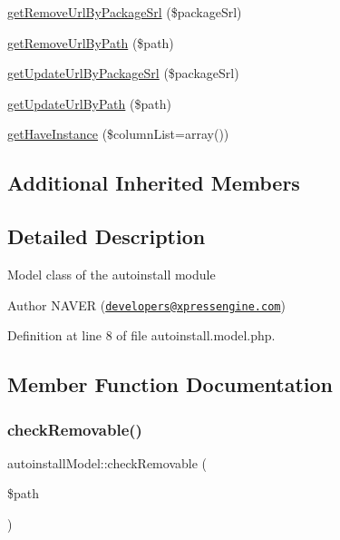 \begin{DoxyCompactItemize}
\hyperlink{classautoinstallModel_aa2b3fa8f08e15bfb1a9a061aca6dfa8c}{get\+Remove\+Url\+By\+Package\+Srl} (\$package\+Srl)
\item 
\hyperlink{classautoinstallModel_a40c61ad733cb70958d2c550f06abc15d}{get\+Remove\+Url\+By\+Path} (\$path)
\item 
\hyperlink{classautoinstallModel_a20c447d210dff0edc286007b92ec881f}{get\+Update\+Url\+By\+Package\+Srl} (\$package\+Srl)
\item 
\hyperlink{classautoinstallModel_a560f4c8850324ee4e0c3dc74573bc7d9}{get\+Update\+Url\+By\+Path} (\$path)
\item 
\hyperlink{classautoinstallModel_ac2f036319c53b9a9392a7b4534fef4fd}{get\+Have\+Instance} (\$column\+List=array())
\end{DoxyCompactItemize}
\subsection*{Additional Inherited Members}


\subsection{Detailed Description}
Model class of the autoinstall module \begin{DoxyAuthor}{Author}
N\+A\+V\+ER (\href{mailto:developers@xpressengine.com}{\tt developers@xpressengine.\+com}) 
\end{DoxyAuthor}


Definition at line 8 of file autoinstall.\+model.\+php.



\subsection{Member Function Documentation}
\hypertarget{classautoinstallModel_ab4637f5520f16fffe622f5abd73253b0}{}\label{classautoinstallModel_ab4637f5520f16fffe622f5abd73253b0} 
\subsubsection{\texorpdfstring{check\+Removable()}{checkRemovable()}}
{\footnotesize\ttfamily autoinstall\+Model\+::check\+Removable (\begin{DoxyParamCaption}\item[{}]{\$path }\end{DoxyParamCaption})}

